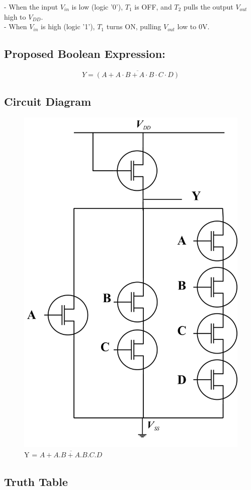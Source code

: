 \documentclass[a4paper,12pt]{article}
\begin{document}
	- When the input \(V_{in}\) is low (logic '0'), \(T_1\) is OFF, and \(T_2\) pulls the output \(V_{out}\) high to \(V_{DD}\).\\
	- When \(V_{in}\) is high (logic '1'), \(T_1\) turns ON, pulling \(V_{out}\) low to 0V.
	\newpage
	\subsection{Proposed Boolean Expression:}
		\[
	Y = \overline{(A + A \cdot B + A \cdot B \cdot C \cdot D)}
	\]
	\subsection{Circuit Diagram}
	
	\begin{figure}[H]
		\centering
		\includegraphics[width=0.4\linewidth]{Images/open}
		\caption{Y = $\overline{A + A . B + A . B . C . D}$}
		\label{fig:open}
	\end{figure}
	\subsection{Truth Table}
	
\end{document}
